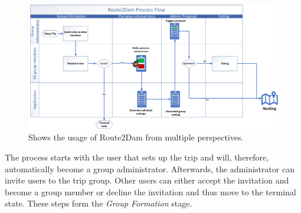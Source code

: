 \documentclass[11pt,a4paper,oneside]{article}
\begin{document}
\begin{figure}[H]
    \centering
    \includegraphics[width=1.1\linewidth]{paper/imgs/process_flow.png}
    \caption{Shows the usage of Route2Dam from multiple perspectives.}
    \label{fig:flowchart1}
\end{figure}

The process starts with the user that sets up the trip and will, therefore, automatically become a group administrator. Afterwards, the administrator can invite users to the trip group. Other users can either accept the invitation and become a group member or decline the invitation and thus move to the terminal state. These steps form the \emph{Group Formation} stage. 
\end{document}

